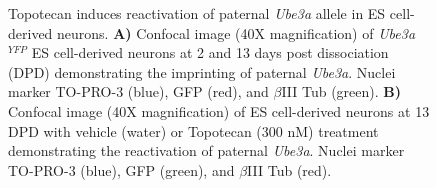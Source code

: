 \begin{figure}[ht]
  \centering
  \caption{Topotecan induces reactivation of paternal \emph{Ube3a} allele in ES cell-derived neurons. \textbf{A)} Confocal image (40X magnification) of \emph{Ube3a$^{YFP}$} ES cell-derived neurons at 2 and 13 days post dissociation (DPD) demonstrating the imprinting of paternal \emph{Ube3a}. Nuclei marker TO-PRO-3 (blue), GFP (red), and \( \beta \)III Tub (green). \textbf{B)} Confocal image (40X magnification) of ES cell-derived neurons at 13 DPD with vehicle (water) or Topotecan (300 nM) treatment demonstrating the reactivation of paternal \emph{Ube3a}. Nuclei marker TO-PRO-3 (blue), GFP (green), and \( \beta \)III Tub (red).}
\end{figure}

